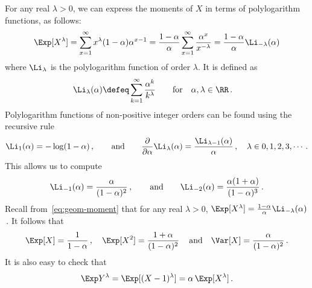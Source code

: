 For any real $\lambda > 0$, we can express the moments of $X$ in terms of polylogarithm functions, as follows:
\begin{align}\label{eq:geom-moment}
    \Exp[X^\lambda]
    = \sum_{x=1}^\infty{  x^\lambda (1-\alpha) \alpha^{x-1} } 
    = \frac{1-\alpha}{\alpha} \sum_{x=1}^\infty{ \frac{\alpha^{x}}{x^{-\lambda} } } 
    = \frac{1-\alpha}{\alpha}\Li_{-\lambda}(\alpha)
\end{align}
where $\Li_{\lambda}$ is the polylogarithm function of order $\lambda$. It is defined as
\begin{align}\label{eq:polylog}
    \Li_{\lambda}(\alpha) &\defeq \sum_{k=1}^\infty{ \frac{\alpha^k}{k^\lambda}}
    \qquad \text{for}\quad \alpha, \lambda \in \RR
    \,.
\end{align}
Polylogarithm functions of non-positive integer orders can be found using the recursive rule 
\[
    \Li_1(\alpha) = -\log(1-\alpha)
    \, , \qquad \text{and} \qquad
    \dfrac{\partial}{\partial \alpha}{\Li_{\lambda}(\alpha)} = \frac{\Li_{\lambda-1}(\alpha)}{\alpha}
    \, ,\quad \lambda \in 0, 1, 2, 3, \cdots
    \, .
\] 
This allows us to compute
\begin{align}\label{eq:polylog-1-2}
    \Li_{-1}(\alpha) = \frac{\alpha}{(1-\alpha)^2}\, , \qquad \text{and} \qquad 
    \Li_{-2}(\alpha) = \frac{\alpha (1+\alpha)}{(1-\alpha)^3} 
    \, .
\end{align}
Recall from~\eqref{eq:geom-moment} that 
for any real $\lambda > 0$, 
$\Exp[X^\lambda] = \frac{1-\alpha}{\alpha}\Li_{-\lambda}(\alpha)$
\,. 
It follows that 
\begin{align}\label{eq:geom-moments-1-2}
    \Exp [X] = \frac{1}{1-\alpha}
    \, , \quad 
    \Exp[X^2] 
    = \frac{1 + \alpha}{(1-\alpha)^2} 
    \, \quad \text{and}\quad
    \Var[X] = \frac{\alpha}{(1-\alpha)^2}
    \, .
\end{align}
It is also easy to check that 
\begin{equation}\label{eq:geom-moment-x-minus-one}
    \Exp Y^\lambda = \Exp[(X-1)^\lambda] = \alpha\,\Exp[X^\lambda]
    \,.
\end{equation}

